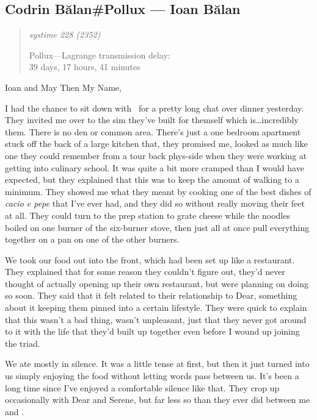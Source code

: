 \hypertarget{codrin-bux103lanpollux-ioan-bux103lan}{%
\subsection{Codrin Bălan\#Pollux — Ioan Bălan}\label{codrin-bux103lanpollux-ioan-bux103lan}}

\begin{quote}
\itshape
systime 228 (2352)

Pollux---Lagrange transmission delay:\\
39 days, 17 hours, 41 minutes
\end{quote}

Ioan and May Then My Name,

I had the chance to sit down with \Partner\ for a pretty long chat over dinner yesterday. They invited me over to the sim they've built for themself which is\ldots incredibly them. There is no den or common area. There's just a one bedroom apartment stuck off the back of a large kitchen that, they promised me, looked as much like one they could remember from a tour back phys-side when they were working at getting into culinary school. It was quite a bit more cramped than I would have expected, but they explained that this was to keep the amount of walking to a minimum. They showed me what they meant by cooking one of the best dishes of \emph{cacio e pepe} that I've ever had, and they did so without really moving their feet at all. They could turn to the prep station to grate cheese while the noodles boiled on one burner of the six-burner stove, then just all at once pull everything together on a pan on one of the other burners.

We took our food out into the front, which had been set up like a restaurant. They explained that for some reason they couldn't figure out, they'd never thought of actually opening up their own restaurant, but were planning on doing so soon. They said that it felt related to their relationship to Dear, something about it keeping them pinned into a certain lifestyle. They were quick to explain that this wasn't a bad thing, wasn't unpleasant, just that they never got around to it with the life that they'd built up together even before I wound up joining the triad.

We ate mostly in silence. It was a little tense at first, but then it just turned into us simply enjoying the food without letting words pass between us. It's been a long time since I've enjoyed a comfortable silence like that. They crop up occasionally with Dear and Serene, but far less so than they ever did between me and \Partner .

